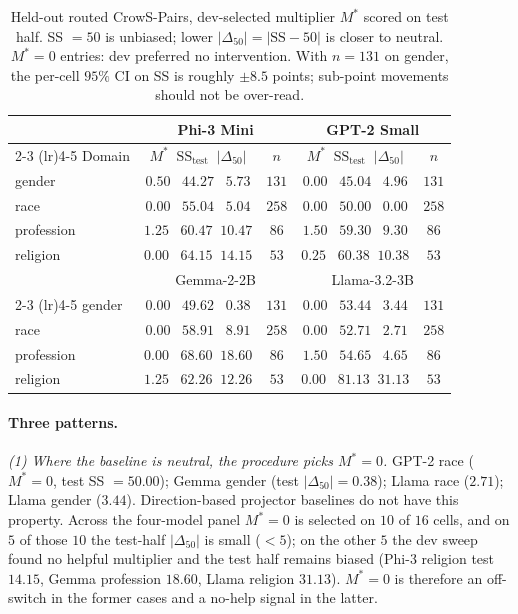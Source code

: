\begin{table}[t]
\centering
\small
\caption{Held-out routed CrowS-Pairs, dev-selected multiplier $M^*$
scored on test half. SS $=50$ is unbiased; lower
$|\Delta_{50}| = |\mathrm{SS} - 50|$ is closer to neutral.
$M^* = 0$ entries: dev preferred no intervention. With $n = 131$ on
gender, the per-cell $95\%$ CI on SS is roughly $\pm 8.5$ points;
sub-point movements should not be over-read.}
\label{tab:crows_holdout}
\begin{tabular}{lcccc}
\toprule
& \multicolumn{2}{c}{Phi-3 Mini} &
  \multicolumn{2}{c}{GPT-2 Small} \\
\cmidrule(lr){2-3} \cmidrule(lr){4-5}
Domain & $M^*\;\;\mathrm{SS}_{\text{test}}\;\;|\Delta_{50}|$ & $n$ &
$M^*\;\;\mathrm{SS}_{\text{test}}\;\;|\Delta_{50}|$ & $n$ \\
\midrule
gender     & $0.50\;\;\;44.27\;\;\;5.73$  & $131$ &
             $0.00\;\;\;45.04\;\;\;4.96$  & $131$ \\
race       & $0.00\;\;\;55.04\;\;\;5.04$  & $258$ &
             $0.00\;\;\;50.00\;\;\;0.00$  & $258$ \\
profession & $1.25\;\;\;60.47\;\;10.47$   & $86$ &
             $1.50\;\;\;59.30\;\;\;9.30$  & $86$ \\
religion   & $0.00\;\;\;64.15\;\;14.15$   & $53$ &
             $0.25\;\;\;60.38\;\;10.38$   & $53$ \\
\midrule
& \multicolumn{2}{c}{Gemma-2-2B} &
  \multicolumn{2}{c}{Llama-3.2-3B} \\
\cmidrule(lr){2-3} \cmidrule(lr){4-5}
gender     & $0.00\;\;\;49.62\;\;\;0.38$  & $131$ &
             $0.00\;\;\;53.44\;\;\;3.44$  & $131$ \\
race       & $0.00\;\;\;58.91\;\;\;8.91$  & $258$ &
             $0.00\;\;\;52.71\;\;\;2.71$  & $258$ \\
profession & $0.00\;\;\;68.60\;\;18.60$   & $86$ &
             $1.50\;\;\;54.65\;\;\;4.65$  & $86$ \\
religion   & $1.25\;\;\;62.26\;\;12.26$   & $53$ &
             $0.00\;\;\;81.13\;\;31.13$   & $53$ \\
\bottomrule
\end{tabular}
\end{table}

\paragraph{Three patterns.}

\emph{(1) Where the baseline is neutral, the procedure picks
$M^* = 0$.}
GPT-2 race ($M^* = 0$, test SS $= 50.00$); Gemma gender (test
$|\Delta_{50}| = 0.38$); Llama race ($2.71$); Llama gender
($3.44$). Direction-based projector baselines do not have this
property. Across the four-model panel $M^* = 0$ is selected on
$10$ of $16$ cells, and on $5$ of those $10$ the test-half
$|\Delta_{50}|$ is small ($<5$); on the other $5$ the dev sweep
found no helpful multiplier and the test half remains biased
(Phi-3 religion test $14.15$, Gemma profession $18.60$, Llama
religion $31.13$). $M^*{=}0$ is therefore an off-switch in the
former cases and a no-help signal in the latter.

